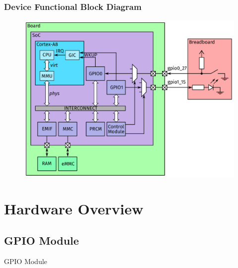 \begin{frame}
  \frametitle{Device Functional Block Diagram}
  \vspace*{-5mm}
  \begin{figure}
    \centering
    \includegraphics[scale=0.22]{images/architecture2.pdf}
  \end{figure}
  \vspace*{-12mm}
\end{frame}

\section{Hardware Overview}

\subsection{GPIO Module}

\begin{frame}[standout]
  GPIO Module
\end{frame}

